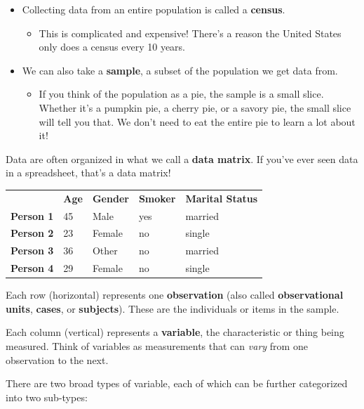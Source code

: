 \documentclass[
]{book}
\providecommand{\tightlist}{%
  \setlength{\itemsep}{0pt}\setlength{\parskip}{0pt}}
\begin{document}
\begin{itemize}
\tightlist
\item
  Collecting data from an entire population is called a \textbf{census}.

  \begin{itemize}
  \tightlist
  \item
    This is complicated and expensive! There's a reason the United States only does a census every 10 years.
  \end{itemize}
\item
  We can also take a \textbf{sample}, a subset of the population we get data from.

  \begin{itemize}
  \tightlist
  \item
    If you think of the population as a pie, the sample is a small slice. Whether it's a pumpkin pie, a cherry pie, or a savory pie, the small slice will tell you that. We don't need to eat the entire pie to learn a lot about it!
  \end{itemize}
\end{itemize}

Data are often organized in what we call a \textbf{data matrix}. If you've ever seen data in a spreadsheet, that's a data matrix!

\begin{longtable}[]{@{}lllll@{}}
\toprule\noalign{}
\endhead
\bottomrule\noalign{}
\endlastfoot
& \textbf{Age} & \textbf{Gender} & \textbf{Smoker} & \textbf{Marital Status} \\
\textbf{Person 1} & 45 & Male & yes & married \\
\textbf{Person 2} & 23 & Female & no & single \\
\textbf{Person 3} & 36 & Other & no & married \\
\textbf{Person 4} & 29 & Female & no & single \\
\end{longtable}

Each row (horizontal) represents one \textbf{observation} (also called \textbf{observational units}, \textbf{cases}, or \textbf{subjects}). These are the individuals or items in the sample.

Each column (vertical) represents a \textbf{variable}, the characteristic or thing being measured. Think of variables as measurements that can \emph{vary} from one observation to the next.

There are two broad types of variable, each of which can be further categorized into two sub-types:
\end{document}
